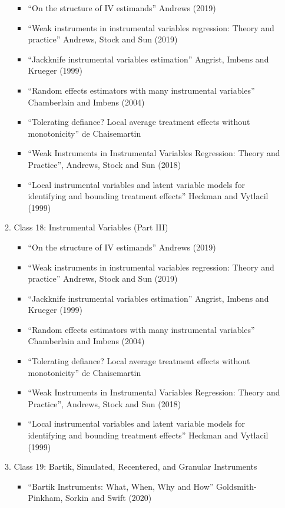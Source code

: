\documentclass[11pt, a4paper]{article}
\begin{document}
\begin{enumerate}
\begin{enumerate}
    \begin{itemize}
    \item ``On the structure of IV estimands'' Andrews (2019)
    \item ``Weak instruments in instrumental variables regression: Theory and practice'' Andrews, Stock and Sun (2019)
    \item ``Jackknife instrumental variables estimation'' Angrist, Imbens and Krueger (1999)
    \item ``Random effects estimators with many instrumental variables'' Chamberlain and Imbens (2004)
    \item ``Tolerating defiance? Local average treatment effects without monotonicity'' de Chaisemartin
    \item ``Weak Instruments in Instrumental Variables Regression: Theory and Practice'', Andrews, Stock and Sun (2018)
    \item ``Local instrumental variables and latent variable models for identifying and bounding treatment effects'' Heckman and Vytlacil (1999)
    \end{itemize}
  \item Class 18: Instrumental Variables (Part III)
    \begin{itemize}
    \item ``On the structure of IV estimands'' Andrews (2019)
    \item ``Weak instruments in instrumental variables regression: Theory and practice'' Andrews, Stock and Sun (2019)
    \item ``Jackknife instrumental variables estimation'' Angrist, Imbens and Krueger (1999)
    \item ``Random effects estimators with many instrumental variables'' Chamberlain and Imbens (2004)
    \item ``Tolerating defiance? Local average treatment effects without monotonicity'' de Chaisemartin
    \item ``Weak Instruments in Instrumental Variables Regression: Theory and Practice'', Andrews, Stock and Sun (2018)
    \item ``Local instrumental variables and latent variable models
      for identifying and bounding treatment effects'' Heckman and
      Vytlacil (1999)
    \end{itemize}
  \item Class 19: Bartik, Simulated, Recentered, and Granular Instruments
    \begin{itemize}
    \item ``Bartik Instruments: What, When, Why and How'' Goldsmith-Pinkham, Sorkin and Swift (2020)

\end{itemize}
\end{enumerate}
\end{enumerate}
\end{document}
